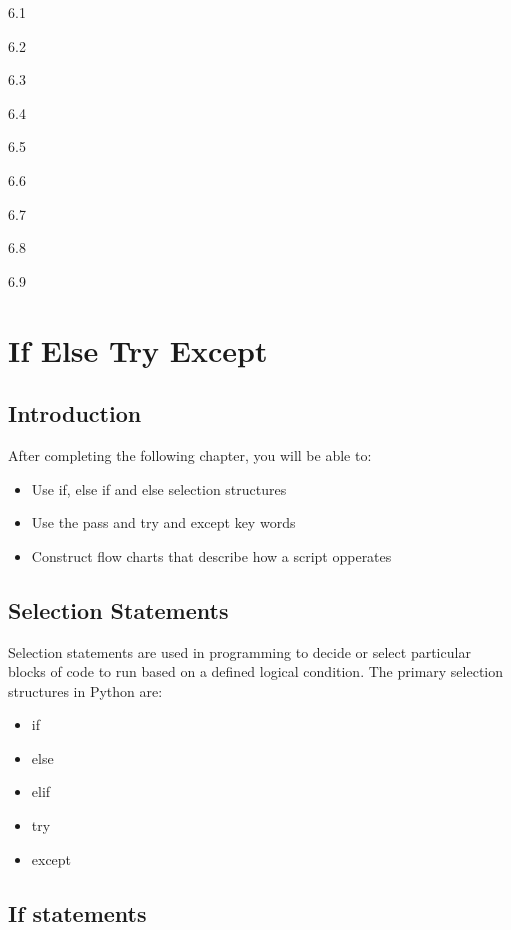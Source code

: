 \documentclass{book}
\providecommand{\tightlist}{%
      \setlength{\itemsep}{0pt}\setlength{\parskip}{0pt}}
\begin{document}
    6.1

6.2

6.3

6.4

6.5

6.6

6.7

6.8

6.9

    \chapter{If Else Try Except}\label{if-else-try-except}

    \section{Introduction}\label{introduction}

    After completing the following chapter, you will be able to:

\begin{itemize}
\item
  Use if, else if and else selection structures
\item
  Use the pass and try and except key words
\item
  Construct flow charts that describe how a script opperates
\end{itemize}

    \section{Selection Statements}\label{selection-statements}

    Selection statements are used in programming to decide or select
particular blocks of code to run based on a defined logical condition.
The primary selection structures in Python are:

\begin{itemize}
\tightlist
\item
  if
\item
  else
\item
  elif
\item
  try
\item
  except
\end{itemize}

    \section{If statements}\label{if-statements}
\end{document}
